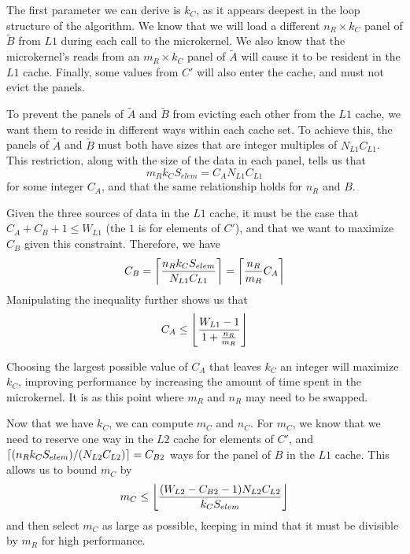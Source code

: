 \documentclass[12pt]{article}
\DeclarePairedDelimiter\ceil{\lceil}{\rceil}
\DeclarePairedDelimiter\floor{\lfloor}{\rfloor}
\begin{document}
The first parameter we can derive is $k_C$, as it appears deepest in the loop structure of the algorithm.
We know that we will load a different $n_R \times k_C$ panel of $\widetilde{B}$ from $L1$ during each call to the microkernel.
We also know that the microkernel's reads from an $m_R \times k_C$ panel of $\widetilde{A}$ will cause it to be resident in the $L1$ cache.
Finally, some values from $C'$ will also enter the cache, and must not evict the panels.

To prevent the panels of $\widetilde{A}$ and $\widetilde{B}$ from evicting each other from the $L1$ cache, we want them to reside in different ways within each cache set.
To achieve this, the panels of $\widetilde{A}$ and $\widetilde{B}$ must both have sizes that are integer multiples of $N_{L1}C_{L1}$.
This restriction, along with the size of the data in each panel, tells us that
\begin{equation*}
  m_Rk_CS_{elem} = C_AN_{L1}C_{L1}
\end{equation*}
for some integer $C_A$, and that the same relationship holds for $n_R$ and $B$.

Given the three sources of data in the $L1$ cache, it must be the case that $C_A + C_B + 1 \leq W_{L1}$ (the $1$ is for elements of $C'$), and that we want to maximize $C_B$ given this constraint.
Therefore, we have
\begin{equation*}
  C_B = \ceil*{\frac{n_Rk_CS_{elem}}{N_{L1}C_{L1}}} = \ceil*{\frac{n_R}{m_R}C_A}
\end{equation*}
Manipulating the inequality further shows us that
\begin{equation*}
  C_A \leq \floor*{\frac{W_{L1} - 1}{1 + \frac{n_R}{m_R}}}
\end{equation*}

Choosing the largest possible value of $C_A$ that leaves $k_C$ an integer will maximize $k_C$, improving performance by increasing the amount of time spent in the microkernel.
It is as this point where $m_R$ and $n_R$ may need to be swapped.

Now that we have $k_C$, we can compute $m_C$ and $n_C$.
For $m_C$, we know that we need to reserve one way in the $L2$ cache for elements of $C'$, and $\ceil*{(n_Rk_CS_{elem})/(N_{L2}C_{L2})} = C_{B2}$ ways for the panel of $B$ in the $L1$ cache.
This allows us to bound $m_C$ by
\begin{equation*}
  m_C \leq \floor*{\frac{(W_{L2} - C_{B2} - 1)N_{L2}C_{L2}}{k_CS_{elem}}}
\end{equation*}
and then select $m_C$ as large as possible, keeping in mind that it must be divisible by $m_R$ for high performance.
\end{document}
